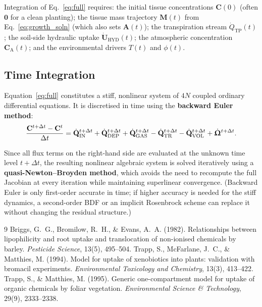 \documentclass[12pt,a4paper]{article}
\begin{document}
Integration of Eq.~\eqref{eq:full} requires: the initial tissue concentrations $\mathbf{C}(0)$ (often $\mathbf{0}$ for a clean planting); the tissue mass trajectory $\mathbf{M}(t)$ from Eq.~\eqref{eq:growth_soln} (which also sets $\mathbf{A}(t)$); the transpiration stream $\dot{Q}_\mathrm{TP}(t)$; the soil-side hydraulic uptake $\dot{\mathbf{U}}_\mathrm{HYD}(t)$; the atmospheric concentration $\mathbf{C}_\mathrm{A}(t)$; and the environmental drivers $T(t)$ and $\phi(t)$.


\subsection{Time Integration}

Equation~\eqref{eq:full} constitutes a stiff, nonlinear system of $4N$ coupled ordinary differential equations.  It is discretised in time using the \textbf{backward Euler method}:
\begin{equation}\label{eq:euler}
    \frac{\mathbf{C}^{t+\Delta t} - \mathbf{C}^t}{\Delta t} = \dot{\mathbf{Q}}_\mathrm{IN}^{t+\Delta t} + \dot{\mathbf{Q}}_\mathrm{DEP}^{t+\Delta t} + \dot{\mathbf{Q}}_\mathrm{GAS}^{t+\Delta t} - \dot{\mathbf{Q}}_\mathrm{TR}^{t+\Delta t} - \dot{\mathbf{Q}}_\mathrm{VOL}^{t+\Delta t} + \dot{\bm{\Upomega}}^{t+\Delta t}.
\end{equation}

Since all flux terms on the right-hand side are evaluated at the unknown time level $t+\Delta t$, the resulting nonlinear algebraic system is solved iteratively using a \textbf{quasi-Newton--Broyden method}, which avoids the need to recompute the full Jacobian at every iteration while maintaining superlinear convergence.  (Backward Euler is only first-order accurate in time; if higher accuracy is needed for the stiff dynamics, a second-order BDF or an implicit Rosenbrock scheme can replace it without changing the residual structure.)


\begin{thebibliography}{9}
 Briggs, G.~G., Bromilow, R.~H., \& Evans, A.~A. (1982). Relationships between lipophilicity and root uptake and translocation of non-ionised chemicals by barley. \emph{Pesticide Science}, 13(5), 495--504.
 Trapp, S., McFarlane, J.~C., \& Matthies, M. (1994). Model for uptake of xenobiotics into plants: validation with bromacil experiments. \emph{Environmental Toxicology and Chemistry}, 13(3), 413--422.
 Trapp, S., \& Matthies, M. (1995). Generic one-compartment model for uptake of organic chemicals by foliar vegetation. \emph{Environmental Science \& Technology}, 29(9), 2333--2338.
\end{thebibliography}
\end{document}
